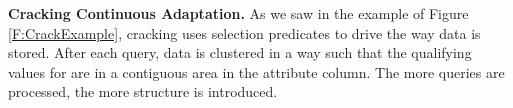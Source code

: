 \documentclass{sig-alternate}
\begin{document}
\textbf{Cracking Continuous Adaptation.} As we saw in the example of Figure \ref{F:CrackExample}, cracking uses selection predicates to drive the way data is stored. After each query, data is clustered in a way such that the qualifying values for are in a contiguous area in the attribute column. The more queries are processed, the more structure is introduced.

\begin{figure}[t]
\hspace{6.5em}%
\hfill
\hspace{6.5em}%
\end{figure}
\end{document}
